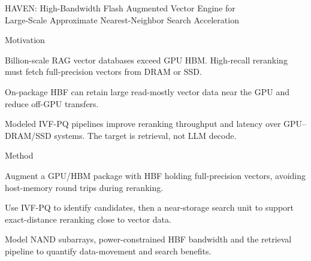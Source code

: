 \begin{frame}[t]{HAVEN: High-Bandwidth Flash Augmented Vector Engine for\\Large-Scale Approximate Nearest-Neighbor Search Acceleration}
\vspace{.02cm}
\begin{minipage}[t][3.25cm][t]{\linewidth}
\begin{summarysection}{Motivation}
\item {} Billion-scale RAG vector databases exceed GPU HBM. High-recall reranking must fetch full-precision vectors from DRAM or SSD.
\item {} On-package HBF can retain large read-mostly vector data near the GPU and reduce off-GPU transfers.
\item {} Modeled IVF-PQ pipelines improve reranking throughput and latency over GPU--DRAM/SSD systems. The target is retrieval, not LLM decode.
\end{summarysection}
\end{minipage}
\vspace{.18cm}
\begin{summarysection}{Method}
\item {} Augment a GPU/HBM package with HBF holding full-precision vectors, avoiding host-memory round trips during reranking.
\item {} Use IVF-PQ to identify candidates, then a near-storage search unit to support exact-distance reranking close to vector data.
\item {} Model NAND subarrays, power-constrained HBF bandwidth and the retrieval pipeline to quantify data-movement and search benefits.
\end{summarysection}
\end{frame}
